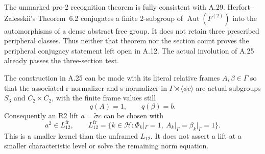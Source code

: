 The unmarked pro-2 recognition theorem is fully
consistent with A.29. Herfort--Zalesskii's
Theorem~6.2 conjugates a finite 2-subgroup of
\(\operatorname{Aut}(F^{(2)})\) into the
automorphisms of a dense abstract free group.
It does not retain three prescribed peripheral
classes.\cite{AHerfortZalesskii2013}
Thus neither that theorem nor the section count
proves the peripheral conjugacy statement left
open in A.12. The actual involution of A.25
already passes the three-section test.

The construction in A.25 can be made with its literal
relative frames \(A,\beta\in\Gamma\) so that the
associated r-normalizer and s-normalizer in
\(\Gamma\rtimes\langle\phi c\rangle\) are actual
subgroups \(S_3\) and \(C_2\times C_2\), with the
finite frame values still
\[
                         q(A)=1,\qquad q(\beta)=b.
\]
Consequently an R2 lift \(a=\widetilde\sigma c\)
can be chosen with
\[
 a^2\in L_{12}^{\mathrm{fr}},\qquad
 L_{12}^{\mathrm{fr}}
 =\{k\in\mathcal H:\Phi_k|_\Gamma=1,
                  \ A_k|_\Gamma=\beta_k|_\Gamma=1\}.
 \tag{A.30.1}
\]
This is a smaller kernel than the unframed
\(L_{12}\). It does not assert a lift at a
smaller characteristic level or solve the remaining
norm equation.

